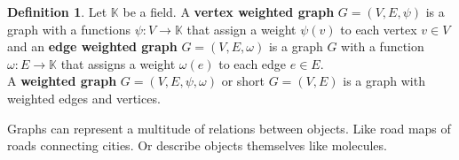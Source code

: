 \documentclass{article}
\theoremstyle{definition}
\newtheorem{definition}[theorem]{Definition}
\begin{document}
\begin{definition}
Let $\mathbb{K}$ be a field. A \textbf{vertex weighted graph} $G = (V, E, \psi)$ is a graph with a functions $\psi : V \to \mathbb{K}$ that assign a weight $\psi(v)$ to each vertex $v \in V$ and an \textbf{edge weighted graph} $G = (V, E, \omega)$ is a graph $G$ with a function $\omega : E \to \mathbb{K}$ that assigns a weight $\omega(e)$ to each edge $e \in E$. \\
A \textbf{weighted graph} $G = (V, E, \psi, \omega)$ or short $G = (V, E)$ is a graph with weighted edges and vertices.
\end{definition}


Graphs can represent a multitude of relations between objects. Like road maps of roads connecting cities. Or describe objects themselves like molecules.
\end{document}
